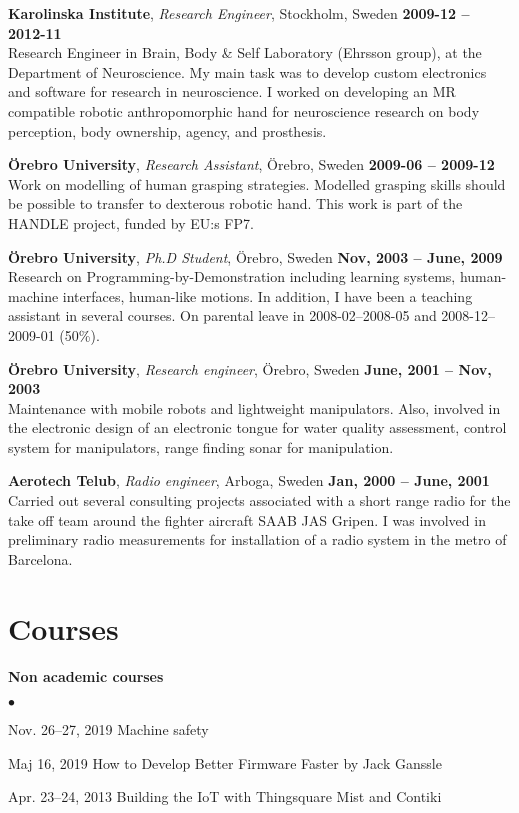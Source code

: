 \documentclass[a4paper,margin,line]{res} \usepackage{latexsym}
\newenvironment{list2}{
  \begin{list}{$\bullet$}{%
      \setlength{\itemsep}{0in} \setlength{\parsep}{0in}
      \setlength{\parskip}{0in} \setlength{\topsep}{0in}
      \setlength{\partopsep}{0in}
      \setlength{\leftmargin}{0.2in}}}{\end{list}}
\begin{document}
\begin{resume}

{\bf Karolinska Institute}, {\em Research Engineer}, Stockholm, Sweden
\hfill {\bf 2009-12 -- 2012-11}\\ Research Engineer in Brain, Body \&
Self Laboratory (Ehrsson group), at the Department of Neuroscience.
My main task was to develop custom electronics and software for
research in neuroscience.  I worked on developing an MR compatible
robotic anthropomorphic hand for neuroscience research on body
perception, body ownership, agency, and prosthesis.

{\bf Örebro University}, {\em Research Assistant}, Örebro, Sweden
\hfill {\bf 2009-06 -- 2009-12}\\ Work on modelling of human grasping
strategies. Modelled grasping skills should be possible to transfer to
dexterous robotic hand. This work is part of the HANDLE project,
funded by EU:s FP7.

{\bf Örebro University}, {\em Ph.D Student}, Örebro, Sweden \hfill
{\bf Nov, 2003 -- June, 2009}\\ Research on
Programming-by-Demonstration including learning systems, human-machine
interfaces, human-like motions.  In addition, I have been a teaching
assistant in several courses.  On parental leave in 2008-02--2008-05
and 2008-12--2009-01 (50\%).

{\bf Örebro University}, {\em Research engineer}, Örebro, Sweden
\hfill {\bf June, 2001 -- Nov, 2003}\\ Maintenance with mobile robots
and lightweight manipulators. Also, involved in the electronic design
of an electronic tongue for water quality assessment, control system
for manipulators, range finding sonar for manipulation.

{\bf Aerotech Telub}, {\em Radio engineer}, Arboga, Sweden \hfill {\bf
  Jan, 2000 -- June, 2001}\\ Carried out several consulting projects
associated with a short range radio for the take off team around the
fighter aircraft SAAB JAS Gripen.  I was involved in preliminary radio
measurements for installation of a radio system in the metro of
Barcelona.

\section{\sc Courses}
{\bf Non academic courses}\\
\begin{list2}
\item Nov. 26--27, 2019 Machine safety
\item Maj 16, 2019 How to Develop Better Firmware Faster by Jack Ganssle
  \item Apr. 23--24, 2013 Building the IoT with Thingsquare Mist and Contiki
\end{list2}



\end{resume}
\end{document}

